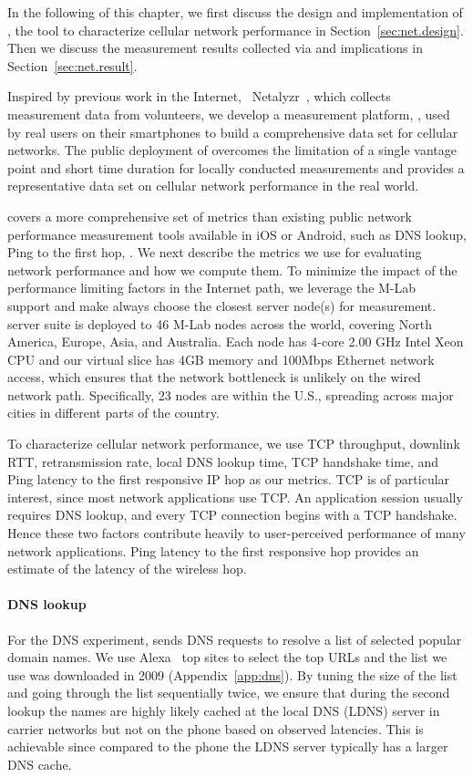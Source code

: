 In the following of this chapter, we first discuss the design and implementation of \mobiperf, the tool to characterize cellular network performance in Section~\ref{sec:net.design}. Then we discuss the measurement results collected via \mobiperf and implications in Section~\ref{sec:net.result}.


\label{sec:net.design}

Inspired by previous work in the Internet, \eg~Netalyzr~\cite{netalyzr}, which collects measurement data from volunteers, we develop a measurement platform, \mobiperf, used by real users on their smartphones to build a comprehensive data set for cellular networks. The public deployment of \mobiperf overcomes the limitation of a single vantage point and short time duration for locally conducted measurements and provides a representative data set on cellular network performance in the real world.

\mobiperf covers a more comprehensive set of metrics than existing public network performance measurement tools available in iOS or Android, such as DNS lookup, Ping to the first hop, \etc. We next describe the metrics we use for evaluating network performance and how we compute them. To minimize the impact of the performance limiting factors in the Internet path, we leverage the M-Lab~\cite{mlab} support and make \mobiperf always choose the closest server node(s) for measurement. \mobiperf server suite is deployed to 46 M-Lab nodes across the world, covering North America, Europe, Asia, and Australia.  Each node has 4-core 2.00 GHz Intel Xeon CPU and our virtual slice has 4GB memory and 100Mbps Ethernet network access, which ensures that the network bottleneck is unlikely on the wired network path. Specifically, 23 nodes are within the U.S., spreading across major cities in different parts of the country. 

To characterize cellular network performance, we use TCP throughput, downlink RTT, retransmission rate, local DNS lookup time, TCP handshake time, and Ping latency to the first responsive IP hop as our metrics. TCP is of particular interest, since most network applications use TCP. An application session usually requires DNS lookup, and every TCP connection begins with a TCP handshake. Hence these two factors contribute heavily to user-perceived performance of many network applications. Ping latency to the first responsive hop provides an estimate of the latency of the wireless hop.

\paragraph{DNS lookup}
For the DNS experiment, \mobiperf sends DNS requests to resolve a list of selected popular domain names. We use Alexa~\cite{alexa} top sites to select the top URLs and the list we use was downloaded in 2009 (Appendix~\ref{app:dns}). By tuning the size of the list and going through the list sequentially twice, we ensure that during the second lookup the names are highly likely cached at the local DNS (LDNS) server in carrier networks but not on the phone based on observed latencies. This is achievable since compared to the phone the LDNS server typically has a larger DNS cache. 



